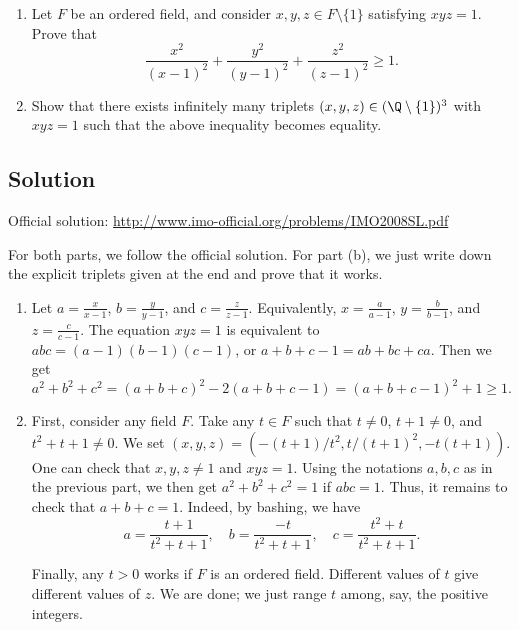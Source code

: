 \begin{enumerate}

\item
Let $F$ be an ordered field, and consider $x, y, z \in F \setminus \{1\}$ satisfying $xyz = 1$.
Prove that \[ \frac{x^2}{(x - 1)^2} + \frac{y^2}{(y - 1)^2} + \frac{z^2}{(z - 1)^2} \geq 1. \]

\item
Show that there exists infinitely many triplets $(x, y, z) \in (\Q \setminus \{1\})^3$ with $xyz = 1$ such that the above inequality becomes equality.

\end{enumerate}



\subsection*{Solution}

Official solution: \url{http://www.imo-official.org/problems/IMO2008SL.pdf}

For both parts, we follow the official solution.
For part (b), we just write down the explicit triplets given at the end and prove that it works.

\begin{enumerate}

\item
Let $a = \frac{x}{x - 1}$, $b = \frac{y}{y - 1}$, and $c = \frac{z}{z - 1}$.
Equivalently, $x = \frac{a}{a - 1}$, $y = \frac{b}{b - 1}$, and $z = \frac{c}{c - 1}$.
The equation $xyz = 1$ is equivalent to $abc = (a - 1)(b - 1)(c - 1)$, or $a + b + c - 1 = ab + bc + ca$.
Then we get
\[ a^2 + b^2 + c^2 = (a + b + c)^2 - 2(a + b + c - 1) = (a + b + c - 1)^2 + 1 \geq 1. \]



\item
First, consider any field $F$.
Take any $t \in F$ such that $t \neq 0$, $t + 1 \neq 0$, and $t^2 + t + 1 \neq 0$.
We set $(x, y, z) = (-(t + 1)/t^2, t/(t + 1)^2, -t(t + 1))$.
One can check that $x, y, z \neq 1$ and $xyz = 1$.
Using the notations $a, b, c$ as in the previous part, we then get $a^2 + b^2 + c^2 = 1$ if $abc = 1$.
Thus, it remains to check that $a + b + c = 1$.
Indeed, by bashing, we have
\[ a = \frac{t + 1}{t^2 + t + 1}, \quad b = \frac{-t}{t^2 + t + 1}, \quad c = \frac{t^2 + t}{t^2 + t + 1}. \]

Finally, any $t > 0$ works if $F$ is an ordered field.
Different values of $t$ give different values of $z$.
We are done; we just range $t$ among, say, the positive integers.

\end{enumerate}
